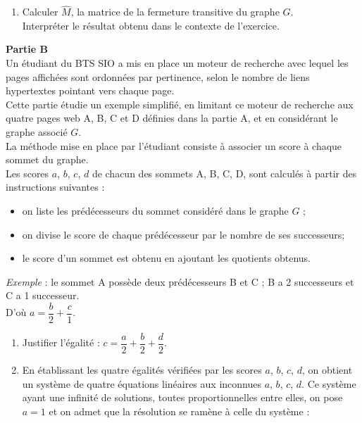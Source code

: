 \begin{exercice}
\begin{enumerate}
\begin{enumalph}
              \end{enumalph}
        \item Calculer $\hat{M}$, la matrice de la fermeture transitive du graphe $G$.\\
              Interpréter le résultat obtenu dans le contexte de l'exercice.
    \end{enumerate}
    \bigskip
    \textbf{Partie B}\\
    \medskip
    Un étudiant du BTS SIO a mis en place un moteur de recherche avec lequel les pages affichées sont
    ordonnées par pertinence, selon le nombre de liens hypertextes pointant vers chaque page.\\
    Cette partie étudie un exemple simplifié, en limitant ce moteur de recherche aux quatre pages web
    A, B, C et D définies dans la partie A, et en considérant le graphe associé $G$.\\
    La méthode mise en place par l'étudiant consiste à associer un score à chaque sommet du graphe.\\
    Les scores $a$, $b$, $c$, $d$ de chacun des sommets A, B, C, D, sont calculés à partir des instructions
    suivantes :
    \begin{itemize}
        \item on liste les prédécesseurs du sommet considéré dans le graphe $G$ ;
        \item on divise le score de chaque prédécesseur par le nombre de ses successeurs;
        \item le score d'un sommet est obtenu en ajoutant les quotients obtenus.
    \end{itemize}
    \emph{Exemple }: le sommet A possède deux prédécesseurs B et C ; B a 2 successeurs et C a 1 successeur.\\
    D'où $a = \dfrac{b}{2} + \dfrac{c}{1}$.
    
    \medskip
    
    \begin{enumerate}
        \item Justifier l'égalité : $c = \dfrac{a}{2} + \dfrac{b}{2} + \dfrac{d}{2}$.
              
        \item  En établissant les quatre égalités vérifiées par les scores $a$, $b$, $c$, $d$, on obtient un système de quatre équations linéaires aux inconnues $a$, $b$, $c$, $d$. Ce système ayant une infinité de solutions,
              toutes proportionnelles entre elles, on pose $a = 1$ et on admet que la résolution se ramène à celle
              du système :
              

\end{enumerate}
\end{exercice}

